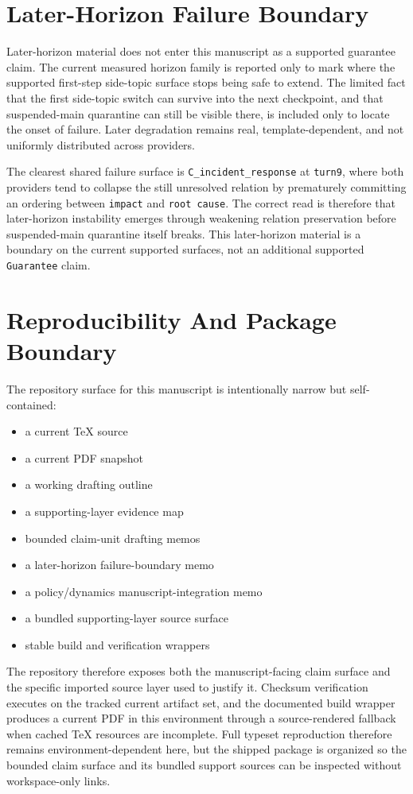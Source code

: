 \documentclass[11pt]{article}
\begin{document}
\section{Later-Horizon Failure Boundary}

Later-horizon material does not enter this manuscript as a supported guarantee
claim. The current measured horizon family is reported only to mark where the
supported first-step side-topic surface stops being safe to extend. The limited
fact that the first side-topic switch can survive into the next checkpoint, and
that suspended-main quarantine can still be visible there, is included only to
locate the onset of failure. Later degradation remains real, template-dependent,
and not uniformly distributed across providers.

The clearest shared failure surface is \texttt{C\_incident\_response} at
\texttt{turn9}, where both providers tend to collapse the still unresolved
relation by prematurely committing an ordering between \texttt{impact} and
\texttt{root cause}. The correct read is therefore that later-horizon
instability emerges through weakening relation preservation before
suspended-main quarantine itself breaks. This later-horizon material is a
boundary on the current supported surfaces, not an additional supported
\texttt{Guarantee} claim.

\section{Reproducibility And Package Boundary}

The repository surface for this manuscript is intentionally narrow but
self-contained:
\begin{itemize}
\item a current TeX source
\item a current PDF snapshot
\item a working drafting outline
\item a supporting-layer evidence map
\item bounded claim-unit drafting memos
\item a later-horizon failure-boundary memo
\item a policy/dynamics manuscript-integration memo
\item a bundled supporting-layer source surface
\item stable build and verification wrappers
\end{itemize}

The repository therefore exposes both the manuscript-facing claim surface and
the specific imported source layer used to justify it. Checksum verification
executes on the tracked current artifact set, and the documented build wrapper
produces a current PDF in this environment through a source-rendered fallback
when cached TeX resources are incomplete. Full typeset reproduction therefore
remains environment-dependent here, but the shipped package is organized so the
bounded claim surface and its bundled support sources can be inspected without
workspace-only links.
\end{document}
